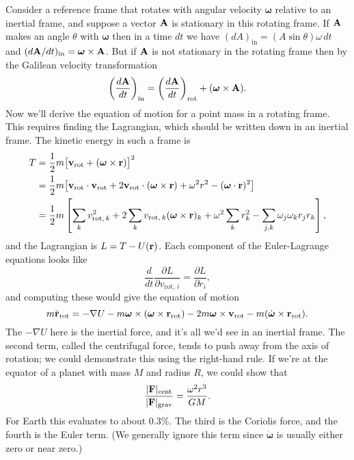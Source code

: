 \documentclass[../p111main.tex]{subfiles}
\begin{document}
Consider a reference frame that rotates with angular velocity $\bm \omega$ relative to an inertial frame, and suppose a vector $\mathbf{A}$ is stationary in this rotating frame.
If $\mathbf{A}$ makes an angle $\theta$ with $\bm \omega$ then in a time $dt$ we have $(dA)_\textrm{in} = (A \sin \theta) \omega \,dt$ and $(d\mathbf{A} / dt)_\textrm{in} = \bm \omega \times \mathbf{A}$.
But if $\mathbf{A}$ is not stationary in the rotating frame then by the Galilean velocity transformation
\[ \left( \frac{d\mathbf{A}}{dt} \right)_\textrm{in} = \left( \frac{d\mathbf{A}}{dt} \right)_\textrm{rot} + (\bm \omega \times \mathbf{A}). \]
Now we'll derive the equation of motion for a point mass in a rotating frame.
This requires finding the Lagrangian, which should be written down in an inertial frame.
The kinetic energy in such a frame is
\begin{align*}
    T &= \frac{1}{2} m \big[ \mathbf{v}_\textrm{rot} + (\bm \omega \times \mathbf{r}) \big]^2 \\
    &= \frac{1}{2} m \big[ \mathbf{v}_\textrm{rot} \cdot \mathbf{v}_\textrm{rot} + 2 \mathbf{v}_\textrm{rot} \cdot (\bm \omega \times \mathbf{r}) + \omega^2 r^2 - (\bm \omega \cdot \mathbf{r})^2 \big] \\
    &= \frac{1}{2} m \left[ \sum_{k}^{} v_{\textrm{rot}, \, k}^2 + 2 \sum_{k}^{} v_{\textrm{rot}, \, k} (\bm \omega \times \mathbf{r})_k + \omega^2 \sum_{k}^{} r_k^2 - \sum_{j,k}^{} \omega_j \omega_k r_j r_k \right],
\end{align*}
and the Lagrangian is $L = T - U(\mathbf{r})$.
Each component of the Euler-Lagrange equations looks like
\[ \frac{d}{dt} \frac{\partial L}{\partial v_{\textrm{rot}, \,i}} = \frac{\partial L}{\partial r_i}, \]
and computing these would give the equation of motion
\[ m \ddot{\mathbf{r}}_\textrm{rot} = - \nabla U - m \bm \omega \times (\bm \omega \times \mathbf{r}_\textrm{rot}) - 2m \bm \omega \times \mathbf{v}_\textrm{rot} - m (\dot{\bm \omega} \times \mathbf{r}_\textrm{rot}). \]
The $-\nabla U$ here is the inertial force, and it's all we'd see in an inertial frame.
The second term, called the centrifugal force, tends to push away from the axis of rotation; we could demonstrate this using the right-hand rule.
If we're at the equator of a planet with mass $M$ and radius $R$, we could show that
\[ \frac{|\mathbf{F}|_\textrm{cent}}{|\mathbf{F}|_\textrm{grav}} = \frac{\omega^2 r^3}{GM}. \]
For Earth this evaluates to about 0.3\%.
The third is the Coriolis force, and the fourth is the Euler term.
(We generally ignore this term since $\dot{\bm \omega}$ is usually either zero or near zero.)
\end{document}
